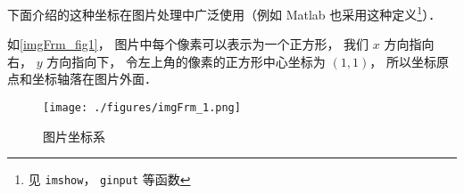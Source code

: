 
下面介绍的这种坐标在图片处理中广泛使用（例如 Matlab 也采用这种定义\footnote{见 \lstinline|imshow|， \lstinline|ginput| 等函数}）．

如\autoref{imgFrm_fig1}， 图片中每个像素可以表示为一个正方形， 我们 $x$ 方向指向右， $y$ 方向指向下， 令左上角的像素的正方形中心坐标为 $(1, 1)$， 所以坐标原点和坐标轴落在图片外面．

\begin{figure}[ht]
\centering
\texttt{[image: ./figures/imgFrm\_1.png]}
\caption{图片坐标系} \label{imgFrm_fig1}
\end{figure}
